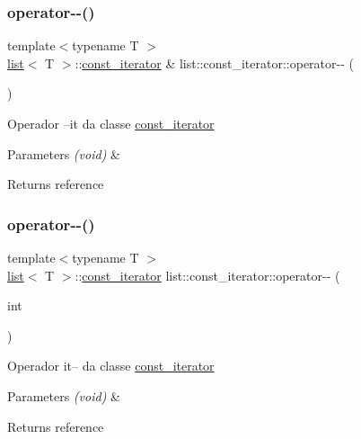 \subsubsection{\texorpdfstring{operator-\/-\/()}{operator--()}\hspace{0.1cm}{\footnotesize\ttfamily [1/2]}}
{\footnotesize\ttfamily template$<$typename T $>$ \\
\mbox{\hyperlink{classsc_1_1list}{list}}$<$ T $>$\+::\mbox{\hyperlink{classsc_1_1list_1_1const__iterator}{const\+\_\+iterator}} \& list\+::const\+\_\+iterator\+::operator-\/-\/ (\begin{DoxyParamCaption}{ }\end{DoxyParamCaption})}

Operador --it da classe \mbox{\hyperlink{classsc_1_1list_1_1const__iterator}{const\+\_\+iterator}} 
\begin{DoxyParams}{Parameters}
{\em (void)} & \\
\hline
\end{DoxyParams}
\begin{DoxyReturn}{Returns}
reference 
\end{DoxyReturn}
\mbox{\label{classsc_1_1list_1_1const__iterator_aa4b38c471c0754e785c10a2e3aa0bf19}} 
\subsubsection{\texorpdfstring{operator-\/-\/()}{operator--()}\hspace{0.1cm}{\footnotesize\ttfamily [2/2]}}
{\footnotesize\ttfamily template$<$typename T $>$ \\
\mbox{\hyperlink{classsc_1_1list}{list}}$<$ T $>$\+::\mbox{\hyperlink{classsc_1_1list_1_1const__iterator}{const\+\_\+iterator}} list\+::const\+\_\+iterator\+::operator-\/-\/ (\begin{DoxyParamCaption}\item[{int}]{ }\end{DoxyParamCaption})}

Operador it-- da classe \mbox{\hyperlink{classsc_1_1list_1_1const__iterator}{const\+\_\+iterator}} 
\begin{DoxyParams}{Parameters}
{\em (void)} & \\
\hline
\end{DoxyParams}
\begin{DoxyReturn}{Returns}
reference 
\end{DoxyReturn}
\mbox{\label{classsc_1_1list_1_1const__iterator_a64650201a32eb1cbc7875e8e7a3434e1}} 
